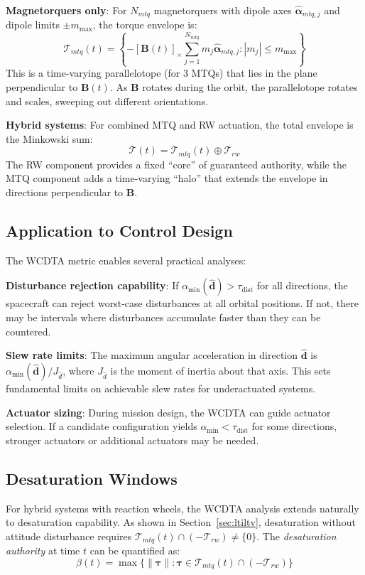 \documentclass[conference]{IEEEtran}
\begin{document}
\textbf{Magnetorquers only}: For $N_{mtq}$ magnetorquers with dipole axes $\hat{\boldsymbol{\alpha}}_{mtq,j}$ and dipole limits $\pm m_{\max}$, the torque envelope is:
\begin{equation}
\mathcal{T}_{mtq}(t) = \left\{ -[\mathbf{B}(t)]_\times \sum_{j=1}^{N_{mtq}} m_j \hat{\boldsymbol{\alpha}}_{mtq,j} : |m_j| \leq m_{\max} \right\}
\end{equation}
This is a time-varying parallelotope (for 3 MTQs) that lies in the plane perpendicular to $\mathbf{B}(t)$. As $\mathbf{B}$ rotates during the orbit, the parallelotope rotates and scales, sweeping out different orientations.

\textbf{Hybrid systems}: For combined MTQ and RW actuation, the total envelope is the Minkowski sum:
\begin{equation}
\mathcal{T}(t) = \mathcal{T}_{mtq}(t) \oplus \mathcal{T}_{rw}
\end{equation}
The RW component provides a fixed ``core'' of guaranteed authority, while the MTQ component adds a time-varying ``halo'' that extends the envelope in directions perpendicular to $\mathbf{B}$.

\subsection{Application to Control Design}
The WCDTA metric enables several practical analyses:

\textbf{Disturbance rejection capability}: If $\alpha_{\min}(\hat{\mathbf{d}}) > \tau_{\text{dist}}$ for all directions, the spacecraft can reject worst-case disturbances at all orbital positions. If not, there may be intervals where disturbances accumulate faster than they can be countered.

\textbf{Slew rate limits}: The maximum angular acceleration in direction $\hat{\mathbf{d}}$ is $\alpha_{\min}(\hat{\mathbf{d}})/J_{\hat{d}}$, where $J_{\hat{d}}$ is the moment of inertia about that axis. This sets fundamental limits on achievable slew rates for underactuated systems.

\textbf{Actuator sizing}: During mission design, the WCDTA can guide actuator selection. If a candidate configuration yields $\alpha_{\min} < \tau_{\text{dist}}$ for some directions, stronger actuators or additional actuators may be needed.

\subsection{Desaturation Windows}
For hybrid systems with reaction wheels, the WCDTA analysis extends naturally to desaturation capability. As shown in Section~\ref{sec:ltiltv}, desaturation without attitude disturbance requires $\mathcal{T}_{mtq}(t) \cap (-\mathcal{T}_{rw}) \neq \{0\}$. The \emph{desaturation authority} at time $t$ can be quantified as:
\begin{equation}
\beta(t) = \max \{ \|\boldsymbol{\tau}\| : \boldsymbol{\tau} \in \mathcal{T}_{mtq}(t) \cap (-\mathcal{T}_{rw}) \}
\end{equation}
\end{document}
